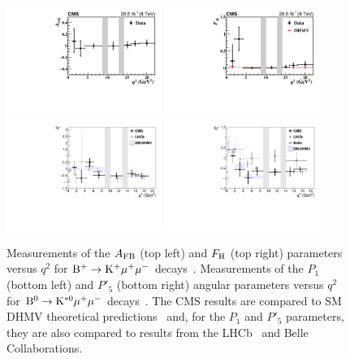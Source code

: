 \documentclass{PoS}
\begin{document}
\begin{figure}[htb]
\centering
\includegraphics[width=0.45\textwidth]{figures/CMS-BPH-15-001_Figure_005-a}
\includegraphics[width=0.45\textwidth]{figures/CMS-BPH-15-001_Figure_005-b}\\
\includegraphics[width=0.45\textwidth]{figures/CMS-BPH-15-008_Figure_003-a}
\includegraphics[width=0.45\textwidth]{figures/CMS-BPH-15-008_Figure_003-b}
\caption{
  Measurements of the $A_{\rm FB}$ (top left) and $F_{\rm H}$ (top right)
  parameters versus $q^2$ for ${\rm B^+ \to K^+\mu^+\mu^-}$ decays~\cite{bph-15-001}.
  Measurements of the $P_1$ (bottom left) and $P'_5$ (bottom right) angular
  parameters versus $q^2$ for ${\rm B^0 \to K^{*0}\mu^+\mu^-}$ decays~\cite{bph-15-008}.
  The CMS results are compared to SM  DHMV theoretical
  predictions~\cite{Descotes-Genon:2014uoa,Descotes-Genon:2015uva} and, for the
  $P_1$ and $P'_5$ parameters, they are also compared to results
  from the LHCb~\cite{LHCb} and Belle~\cite{Belle} Collaborations.
}
\label{fig:BPH-15-001_Figure_005__BPH-15-008_Figure003}
\end{figure}
\end{document}
